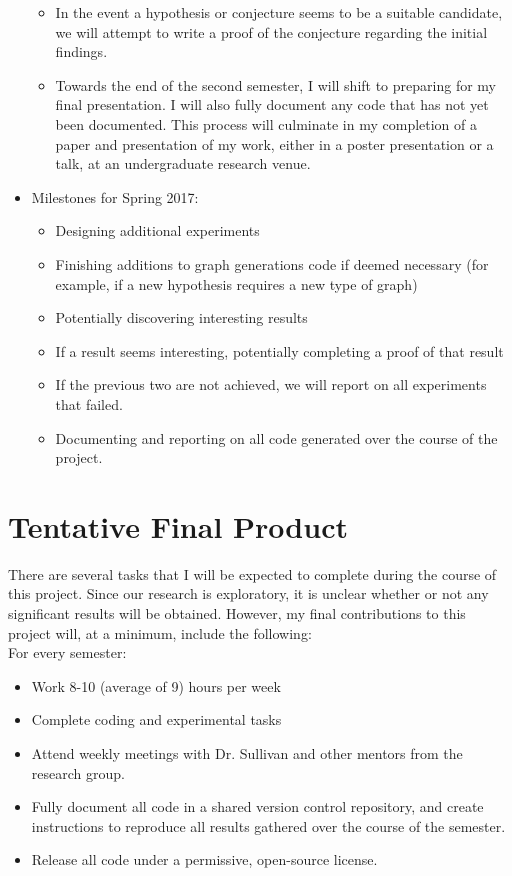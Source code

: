 \documentclass[a4paper,10pt]{article}
\begin{document}
\begin{itemize}
\begin{itemize}
			\item In the event a hypothesis or conjecture seems to be a suitable candidate, we will attempt to write a proof of the conjecture regarding the initial findings.
			\item Towards the end of the second semester, I will shift to preparing for my final presentation.  I will also fully document any code that has not yet been documented.  This process will culminate in my completion of a paper and presentation of my work, either in a poster presentation or a talk, at an undergraduate research venue.	
		\end{itemize}
		\item Milestones for Spring 2017:
		\begin{itemize}
			\item Designing additional experiments
			\item Finishing additions to graph generations code if deemed necessary (for example, if a new hypothesis requires a new type of graph)
			\item Potentially discovering interesting results
			\item If a result seems interesting, potentially completing a proof of that result
			\item If the previous two are not achieved, we will report on all experiments that failed.  
			\item Documenting and reporting on all code generated over the course of the project.
		\end{itemize}
	\end{itemize}
	
	\section{Tentative Final Product}
	There are several tasks that I will be expected to complete during the course of this project.  Since our research is exploratory, it is unclear whether or not any significant results will be obtained.  However, my final contributions to this project will, at a minimum, include the following:\\
	
	\noindent
	For every semester:
	\begin{itemize}
		\item Work 8-10 (average of 9) hours per week
		\item Complete coding and experimental tasks
		\item Attend weekly meetings with Dr. Sullivan and other mentors from the research group.
		\item Fully document all code in a shared version control repository, and create instructions to reproduce all results gathered over the course of the semester.
		\item Release all code under a permissive, open-source license.
	\end{itemize}
	
\end{document}
